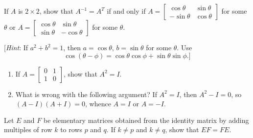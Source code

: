 \documentclass{ximera}
\begin{document}
\begin{problem}
If $A$ is $2 \times 2$, show that $A^{-1} = A^{T}$ if and only if $A = \left[ \begin{array}{rr}
\cos \theta & \sin \theta \\
-\sin \theta & \cos \theta
\end{array} \right]$
 for some $\theta$ or \newline $A = \left[ \begin{array}{rr}
 \cos \theta & \sin \theta \\
 \sin \theta & -\cos \theta
 \end{array} \right]$
 for some $\theta$.


[\textit{Hint}: If $a^{2} + b^{2} = 1$, then $a = \cos \theta$, $b = \sin \theta$ for some $\theta$. Use
\begin{equation*}
\cos(\theta - \phi) = \cos \theta \cos \phi + \sin \theta \sin \phi.]
\end{equation*}

\end{problem}

\begin{problem}

\begin{enumerate}[label={\alph*.}]
\item If $A = \left[ \begin{array}{rr}
0 & 1 \\
1 & 0
\end{array} \right]$,
 show that $A^{2} = I$.

\item What is wrong with the following argument? If $A^{2} = I$, then $A^{2} - I = 0$, so $(A - I)(A + I) = 0$, whence $A = I$ or $A = -I$.

\end{enumerate}
\end{problem}

\begin{problem}
Let $E$ and $F$ be elementary matrices obtained from the identity matrix by adding multiples of row $k$ to rows $p$ and $q$. If $k \neq p$ and $k \neq q$, show that $EF = FE$.

\end{problem}
\end{document}
